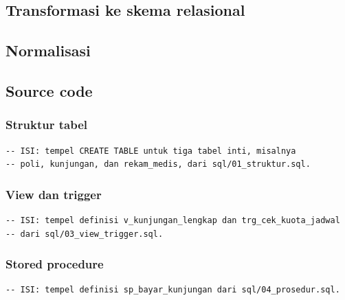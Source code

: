 \documentclass[12pt,a4paper]{article}
\begin{document}
\subsection{Transformasi ke skema relasional}

\subsection{Normalisasi}

\subsection{Source code}

\subsubsection{Struktur tabel}
\begin{lstlisting}
-- ISI: tempel CREATE TABLE untuk tiga tabel inti, misalnya
-- poli, kunjungan, dan rekam_medis, dari sql/01_struktur.sql.
\end{lstlisting}

\subsubsection{View dan trigger}
\begin{lstlisting}
-- ISI: tempel definisi v_kunjungan_lengkap dan trg_cek_kuota_jadwal
-- dari sql/03_view_trigger.sql.
\end{lstlisting}

\subsubsection{Stored procedure}
\begin{lstlisting}
-- ISI: tempel definisi sp_bayar_kunjungan dari sql/04_prosedur.sql.
\end{lstlisting}
\end{document}
